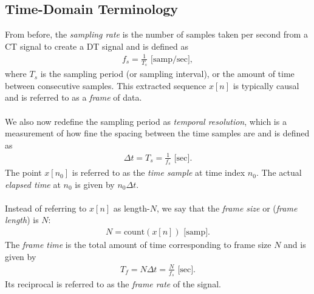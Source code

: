 \documentclass{report}
\begin{document}
\subsection{Time-Domain Terminology}
From before, the \emph{sampling rate} is the number of samples taken per second from a CT signal to create a DT signal and is defined as 
\begin{align}
    f_s = \frac{1}{T_s} \text{ [samp/sec]},
\end{align}
where $T_s$ is the sampling period (or sampling interval), or the amount of time between consecutive samples. This extracted sequence $x[n]$ is typically causal and is referred to as a \emph{frame} of data. 
\\ \\
We also now redefine the sampling period as \emph{temporal resolution}, 
which is a measurement of how fine the spacing between the time samples are and is defined as 
\begin{align}
    \Delta t = T_s = \frac{1}{f_s} \text{ [sec]}.
\end{align}
The point $x[n_0]$ is referred to as the \emph{time sample} at time index $n_0$. 
The actual \emph{elapsed time} at $n_0$ is given by $n_0\Delta t$.
\\ \\
Instead of referring to $x[n]$ as length-$N$, we say that the \emph{frame size} or (\emph{frame length}) is $N$: 
\begin{align}
    N = \text{count}(x[n])  \text{ [samp]}.
\end{align}
The \emph{frame time} is the total amount of time corresponding to frame size $N$ and is given by 
\begin{align}
    T_f = N\Delta t = \frac{N}{f_s}  \text{ [sec]}.
\end{align}
Its reciprocal is referred to as the \emph{frame rate} of the signal.
\end{document}
